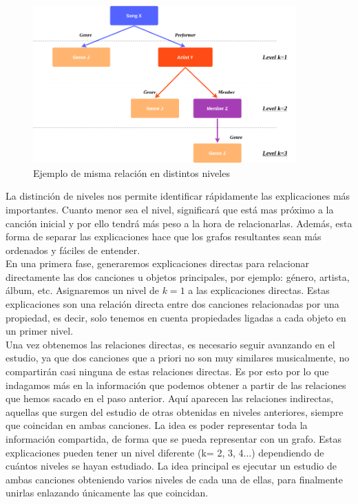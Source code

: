 \begin{figure}[h!]
	\centering
	\includegraphics[width = 0.9\textwidth]{Imagenes/Bitmap/RelationLevels.png}
	\caption{Ejemplo de misma relación en distintos niveles}
	\label{fig:ejemploNiveles}
\end{figure}

La distinción de niveles nos permite identificar rápidamente las explicaciones más importantes. Cuanto menor sea el nivel, significará que está mas próximo a la canción inicial y por ello tendrá más peso a la hora de relacionarlas. Además, esta forma de separar las explicaciones hace que los grafos resultantes sean más ordenados y fáciles de entender.\\

En una primera fase, generaremos explicaciones directas para relacionar directamente las dos canciones u objetos principales, por ejemplo: género, artista, álbum, etc. Asignaremos un nivel de $k=1$ a las explicaciones directas. Estas explicaciones son una relación directa entre dos canciones relacionadas por una propiedad, es decir, solo tenemos en cuenta propiedades ligadas a cada objeto en un primer nivel.\\

Una vez obtenemos las relaciones directas, es necesario seguir avanzando en el estudio, ya que dos canciones que a priori no son muy similares musicalmente, no compartirán casi ninguna de estas relaciones directas. Es por esto por lo que indagamos más en la información que podemos obtener a partir de las relaciones que hemos sacado en el paso anterior. Aquí aparecen las relaciones indirectas, aquellas que surgen del estudio de otras obtenidas en niveles anteriores, siempre que coincidan en ambas canciones. La idea es poder representar toda la información compartida, de forma que se pueda representar con un grafo. Estas explicaciones pueden tener un nivel diferente (k= 2, 3, 4...) dependiendo de cuántos niveles se hayan estudiado. La idea principal es ejecutar un estudio de ambas canciones obteniendo varios niveles de cada una de ellas, para finalmente unirlas enlazando únicamente las que coincidan.\\

